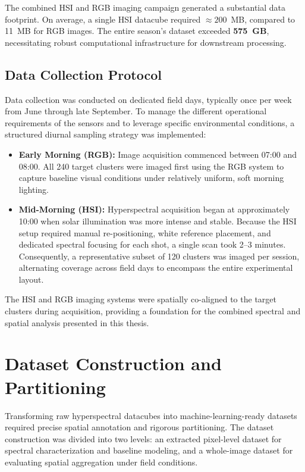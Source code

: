 \medskip
\noindent
The combined HSI and RGB imaging campaign generated a substantial data footprint. On average, a single HSI datacube required $\approx 200$~MB, compared to 11~MB for RGB images. The entire season's dataset exceeded \textbf{575~GB}, necessitating robust computational infrastructure for downstream processing.

\subsection{Data Collection Protocol}

\noindent
Data collection was conducted on dedicated field days, typically once per week from June through late September. To manage the different operational requirements of the sensors and to leverage specific environmental conditions, a structured diurnal sampling strategy was implemented:

\begin{itemize}
    \item \textbf{Early Morning (RGB):} Image acquisition commenced between 07:00 and 08:00. All 240 target clusters were imaged first using the RGB system to capture baseline visual conditions under relatively uniform, soft morning lighting.
    \item \textbf{Mid-Morning (HSI):} Hyperspectral acquisition began at approximately 10:00 when solar illumination was more intense and stable. Because the HSI setup required manual re-positioning, white reference placement, and dedicated spectral focusing for each shot, a single scan took 2--3 minutes. Consequently, a representative subset of 120 clusters was imaged per session, alternating coverage across field days to encompass the entire experimental layout.
\end{itemize}

\medskip
\noindent
The HSI and RGB imaging systems were spatially co-aligned to the target clusters during acquisition, providing a foundation for the combined spectral and spatial analysis presented in this thesis.

\section{Dataset Construction and Partitioning}
\label{sec:dataset_construction}

\noindent
Transforming raw hyperspectral datacubes into machine-learning-ready datasets required precise spatial annotation and rigorous partitioning. The dataset construction was divided into two levels: an extracted pixel-level dataset for spectral characterization and baseline modeling, and a whole-image dataset for evaluating spatial aggregation under field conditions.

